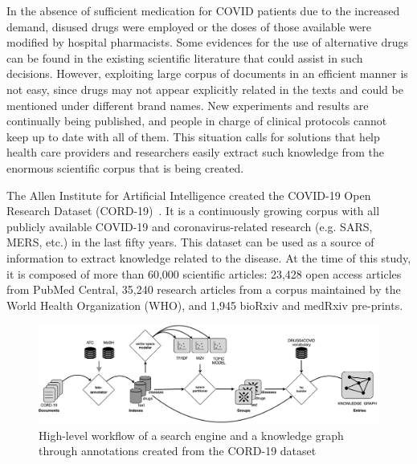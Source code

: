 In the absence of sufficient medication for COVID patients due to the increased demand, disused drugs were employed or the doses of those available were modified by hospital pharmacists. Some evidences for the use of alternative drugs can be found in the existing scientific literature that could assist in such decisions. However, exploiting large corpus of documents in an efficient manner is not easy, since drugs may not appear explicitly related in the texts and could be mentioned under different brand names. New experiments and results are continually being published, and people in charge of clinical protocols cannot keep up to date with all of them. This situation calls for solutions that help health care providers and researchers easily extract such knowledge from the enormous scientific corpus that is being created.

The Allen Institute for Artificial Intelligence created the COVID-19 Open Research Dataset (CORD-19)~\cite{wang2020cord}. It is a continuously growing corpus with all publicly available COVID-19 and coronavirus-related research (e.g. SARS, MERS, etc.) in the last fifty years. This dataset can be used as a source of information to extract knowledge related to the disease. At the time of this study, it is composed of more than 60,000 scientific articles: 23,428 open access articles from PubMed Central, 35,240 research articles from a corpus maintained by the World Health Organization (WHO), and 1,945 bioRxiv and medRxiv pre-prints. 


\begin{figure}[ht]
    \centering
    \includegraphics[width=0.7\linewidth]{d4c-workflow.png}
    \caption{High-level workflow of a search engine and a knowledge graph through annotations created from the CORD-19 dataset}
    \label{fig:d4c-workflow}
\end{figure}

